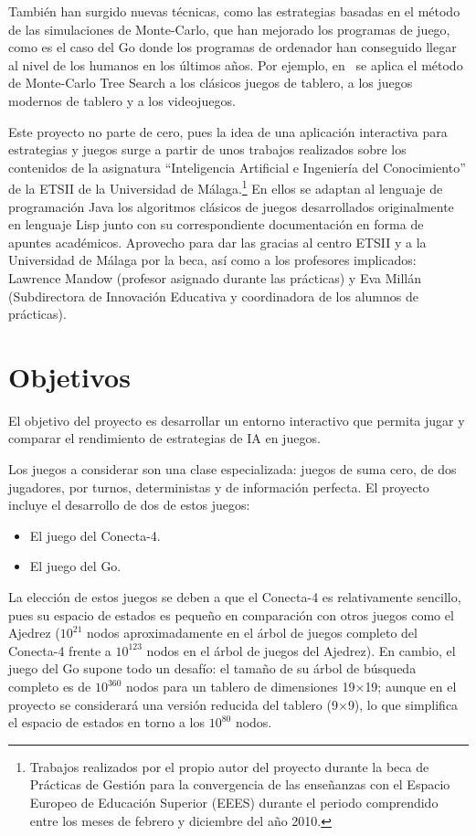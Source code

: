 También han surgido nuevas técnicas, como las estrategias basadas en el método de las simulaciones de Monte-Carlo, que han mejorado los programas de juego, como es el caso del Go donde los programas de ordenador han conseguido llegar al nivel de los humanos en los últimos años.
Por ejemplo, en~ se aplica el método de Monte-Carlo Tree Search a los clásicos juegos de tablero, a los juegos modernos de tablero y a los videojuegos.

Este proyecto no parte de cero, pues la idea de una aplicación interactiva para estrategias y juegos surge a partir de unos trabajos realizados sobre los contenidos de la asignatura ``Inteligencia Artificial e Ingeniería del Conocimiento'' de la ETSII de la Universidad de Málaga.\footnote{Trabajos realizados por el propio autor del proyecto durante la beca de Prácticas de Gestión para la convergencia de las enseñanzas con el Espacio Europeo de Educación Superior (EEES) durante el periodo comprendido entre los meses de febrero y diciembre del año 2010.} 
En ellos  se adaptan al lenguaje de programación Java los algoritmos clásicos de juegos desarrollados originalmente en lenguaje Lisp  junto con su correspondiente documentación en forma de apuntes académicos.
Aprovecho para dar las gracias al centro ETSII y a la Universidad de Málaga por la beca, así como a los profesores implicados: Lawrence Mandow (profesor asignado durante las prácticas) y Eva Millán (Subdirectora de Innovación Educativa y coordinadora de los alumnos de prácticas).
 
\section{Objetivos}
El objetivo del proyecto es desarrollar un entorno interactivo que permita jugar y comparar el rendimiento de estrategias de IA en juegos.

Los juegos a considerar son una clase especializada: juegos de suma cero, de dos jugadores, por turnos, deterministas y de información perfecta.
El proyecto incluye el desarrollo de dos de estos juegos:
\begin{itemize}
	\item El juego del Conecta-4.
	\item El juego del Go.
\end{itemize}
La elección de estos juegos se deben a que el Conecta-4 es relativamente sencillo, pues su espacio de estados es pequeño en comparación con otros juegos como el Ajedrez ($10^{21}$ nodos aproximadamente en el árbol de juegos completo del Conecta-4 frente a $10^{123}$ nodos en el árbol de juegos del Ajedrez).
En cambio, el juego del Go supone todo un desafío: el tamaño de su árbol de búsqueda completo es de $10^{360}$ nodos para un tablero de dimensiones 19$\times$19; aunque en el proyecto se considerará una versión reducida del tablero (9$\times$9), lo que simplifica el espacio de estados en torno a los $10^{80}$ nodos.

